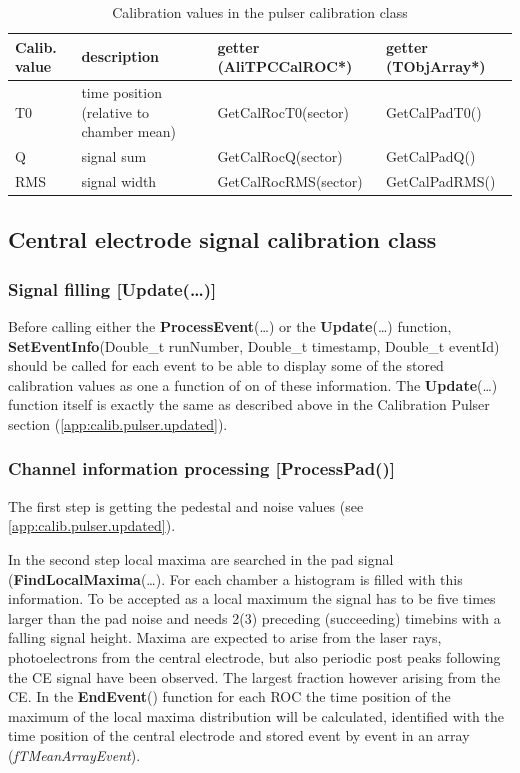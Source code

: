 \begin{table}[H]
  \footnotesize
  \centering
  \begin{tabular}{l|p{3.2cm}|l|l}
  \hline
{\bf Calib. value} & {\bf description} & {\bf getter} {\scriptsize (AliTPCCalROC*)} & {\bf getter} {\scriptsize (TObjArray*)}\\
  \hline
  \hline
  T0  & time position {\footnotesize (relative to chamber mean)} & GetCalRocT0(sector) & GetCalPadT0() \\
  \hline
  Q   & signal sum          & GetCalRocQ(sector)    & GetCalPadQ() \\
  \hline
  RMS & signal width        & GetCalRocRMS(sector)  & GetCalPadRMS() \\
  \hline
  \end{tabular}
  \caption{Calibration values in the pulser calibration class}
  \label{app:tab.pulser}
\end{table}


\subsection{Central electrode signal calibration class}
\subsubsection{Signal filling {\small [Update(\dots)]}}
Before calling either the {\bf ProcessEvent}(\dots) or the {\bf Update}(\dots) function, {\bf SetEventInfo}(Double\_t runNumber, Double\_t timestamp, Double\_t eventId) should be called for each event to be able to display some of the stored calibration values as one a function of on of these information. The {\bf Update}(\dots) function itself is exactly the same as described above in the Calibration Pulser section (\ref{app:calib.pulser.updated}).

\subsubsection{Channel information processing {\small [ProcessPad()]}}
The first step is getting the pedestal and noise values (see \ref{app:calib.pulser.updated}).

In the second step local maxima are searched in the pad signal ({\bf FindLocalMaxima}(\dots).  For each chamber a histogram is filled with this information. To be accepted as a local maximum the signal has to be five times larger than the pad noise and needs 2(3) preceding (succeeding) timebins with a falling signal height. Maxima are expected to arise from the laser rays, photoelectrons from the central electrode, but also periodic post peaks following the CE signal have been observed. The largest fraction however arising from the CE. In the {\bf EndEvent}() function for each ROC the time position of the maximum of the local maxima distribution will be calculated, identified with the time position of the central electrode and stored event by event in an array ({\it fTMeanArrayEvent}).

